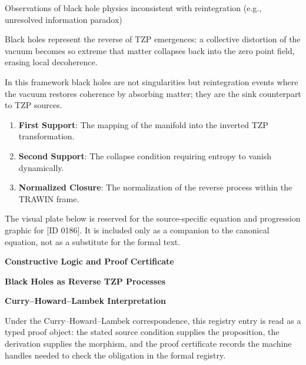 Observations of black hole physics inconsistent with reintegration (e.g., unresolved information paradox)

Black holes represent the reverse of TZP emergences: a collective distortion of the vacuum becomes so extreme that matter collapses back into the zero point field, erasing local decoherence.  

In this framework black holes are not singularities but reintegration events where the vacuum restores coherence by absorbing matter; they are the sink counterpart to TZP sources.  
\endgroup

\begin{enumerate}[leftmargin=1.6em,itemsep=6pt,topsep=4pt]
\item \textbf{First Support}: The mapping of the manifold into the inverted TZP transformation.
\item \textbf{Second Support}: The collapse condition requiring entropy to vanish dynamically.
\item \textbf{Normalized Closure}: The normalization of the reverse process within the TRAWIN frame.
\end{enumerate}

\begingroup\footnotesize\sloppy
The visual plate below is reserved for the source-specific equation and progression graphic for [ID 0186]. It is included only as a companion to the canonical equation, not as a substitute for the formal text.
\par\endgroup
\ifTZPDarkEdition
{}
\fi

\clearpage
\begingroup\tzpsupportsetup
\noindent\textbf{\fontsize{10.8pt}{12.8pt}\selectfont [ID 0186] Constructive Logic and Proof Certificate}\par
\noindent\textbf{\fontsize{10pt}{12pt}\selectfont Black Holes as Reverse TZP Processes}\par
\vspace{0.45em}
\begingroup
\footnotesize
\setlength{\parskip}{0.22em}
\setlength{\parindent}{0pt}
\noindent\textbf{Curry--Howard--Lambek Interpretation}\par
Under the Curry--Howard--Lambek correspondence, this registry entry is read as a typed proof
object: the stated source condition supplies the proposition, the derivation supplies the
morphism, and the proof certificate records the machine handles needed to check the obligation
in the formal registry.

